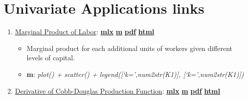 \documentclass[
]{book}
\providecommand{\tightlist}{%
  \setlength{\itemsep}{0pt}\setlength{\parskip}{0pt}}
\begin{document}
\hypertarget{univariate-applications-links}{%
\section{Univariate Applications links}\label{univariate-applications-links}}

\begin{enumerate}
\def\labelenumi{\arabic{enumi}.}
\tightlist
\item
  \href{https://Math4Econ.github.io/derivative_application/htmlpdfm/derivative_MPL_discrete_workers.html}{Marginal Product of Labor}: \href{https://github.com/Math4Econ/Math4Econ.github.io/blob/main/derivative_application/derivative_MPL_discrete_workers.mlx}{\textbf{mlx}} \textbar{} \href{https://github.com/Math4Econ/Math4Econ.github.io/blob/main/derivative_application/htmlpdfm/derivative_MPL_discrete_workers.m}{\textbf{m}} \textbar{} \href{https://github.com/Math4Econ/Math4Econ.github.io/blob/main/derivative_application/htmlpdfm/derivative_MPL_discrete_workers.pdf}{\textbf{pdf}} \textbar{} \href{https://Math4Econ.github.io/derivative_application/htmlpdfm/derivative_MPL_discrete_workers.html}{\textbf{html}}

  \begin{itemize}
  \tightlist
  \item
    Marginal product for each additional units of workers given different levels of capital.
  \item
    \textbf{m}: \emph{plot() + scatter() + legend({[}`k=',num2str(K1){]}, {[}`k=',num2str(K1){]})}
  \end{itemize}
\item
  \href{https://Math4Econ.github.io/derivative_application/htmlpdfm/derivative_cobb_douglas.html}{Derivative of Cobb-Douglas Production Function}: \href{https://github.com/Math4Econ/Math4Econ.github.io/blob/main/derivative_application/derivative_cobb_douglas.mlx}{\textbf{mlx}} \textbar{} \href{https://github.com/Math4Econ/Math4Econ.github.io/blob/main/derivative_application/htmlpdfm/derivative_cobb_douglas.m}{\textbf{m}} \textbar{} \href{https://github.com/Math4Econ/Math4Econ.github.io/blob/main/derivative_application/htmlpdfm/derivative_cobb_douglas.pdf}{\textbf{pdf}} \textbar{} \href{https://Math4Econ.github.io/derivative_application/htmlpdfm/derivative_cobb_douglas.html}{\textbf{html}}


\end{enumerate}
\end{document}
